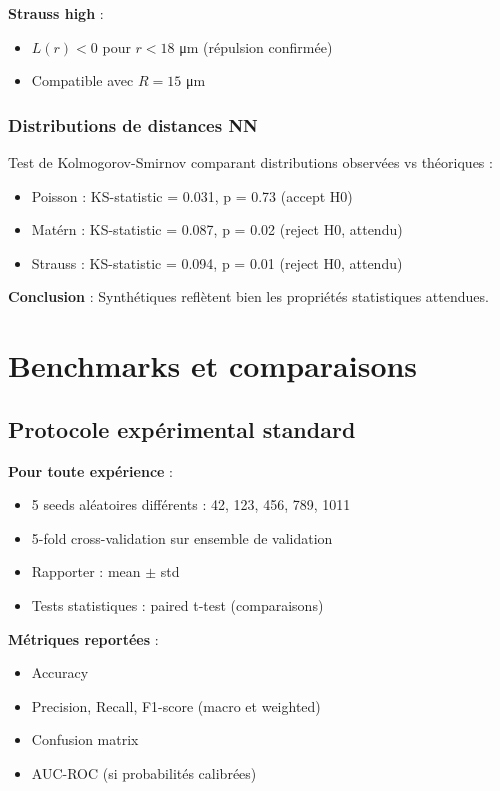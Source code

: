 \textbf{Strauss high} :
\begin{itemize}
    \item $L(r) < 0$ pour $r < 18$ μm (répulsion confirmée)
    \item Compatible avec $R = 15$ μm
\end{itemize}

\subsubsection{Distributions de distances NN}

Test de Kolmogorov-Smirnov comparant distributions observées vs théoriques :
\begin{itemize}
    \item Poisson : KS-statistic = 0.031, p = 0.73 (accept H0)
    \item Matérn : KS-statistic = 0.087, p = 0.02 (reject H0, attendu)
    \item Strauss : KS-statistic = 0.094, p = 0.01 (reject H0, attendu)
\end{itemize}

\textbf{Conclusion} : Synthétiques reflètent bien les propriétés statistiques attendues.

\section{Benchmarks et comparaisons}

\subsection{Protocole expérimental standard}

\textbf{Pour toute expérience} :
\begin{itemize}
    \item 5 seeds aléatoires différents : 42, 123, 456, 789, 1011
    \item 5-fold cross-validation sur ensemble de validation
    \item Rapporter : mean $\pm$ std
    \item Tests statistiques : paired t-test (comparaisons)
\end{itemize}

\textbf{Métriques reportées} :
\begin{itemize}
    \item Accuracy
    \item Precision, Recall, F1-score (macro et weighted)
    \item Confusion matrix
    \item AUC-ROC (si probabilités calibrées)
\end{itemize}

